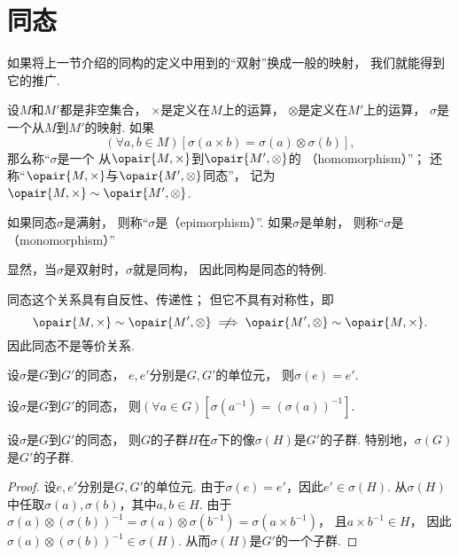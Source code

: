 \section{同态}
如果将上一节介绍的同构的定义中用到的“双射”换成一般的映射，
我们就能得到它的推广.

\begin{definition}
设\(M\)和\(M'\)都是非空集合，
\(\times\)是定义在\(M\)上的运算，
\(\otimes\)是定义在\(M'\)上的运算，
\(\sigma\)是一个从\(M\)到\(M'\)的映射.
如果\[
	(\forall a,b \in M)[
		\sigma(a \times b) = \sigma(a) \otimes \sigma(b)
	],
\]
那么称“\(\sigma\)是一个%
从\(\opair{M,\times}\)到\(\opair{M',\otimes}\)的%
（homomorphism）”；
还称“\(\opair{M,\times}\)与\(\opair{M',\otimes}\)同态”，
记为\(\opair{M,\times} \Homomorphism \opair{M',\otimes}\).
\end{definition}

如果同态\(\sigma\)是满射，
则称“\(\sigma\)是（epimorphism）”.
如果\(\sigma\)是单射，
则称“\(\sigma\)是（monomorphism）”

显然，当\(\sigma\)是双射时，\(\sigma\)就是同构，
因此同构是同态的特例.

同态这个关系具有自反性、传递性；
但它不具有对称性，即\[
	\opair{M,\times}\Homomorphism\opair{M',\otimes}
	\notimplies
	\opair{M',\otimes}\Homomorphism\opair{M,\times}.
\]
因此同态不是等价关系.

\begin{property}
设\(\sigma\)是\(G\)到\(G'\)的同态，
\(e,e'\)分别是\(G,G'\)的单位元，
则\(\sigma(e)=e'\).
\end{property}

\begin{property}
设\(\sigma\)是\(G\)到\(G'\)的同态，
则\((\forall a \in G)[\sigma(a^{-1})=(\sigma(a))^{-1}]\).
\end{property}

\begin{property}
设\(\sigma\)是\(G\)到\(G'\)的同态，
则\(G\)的子群\(H\)在\(\sigma\)下的像\(\sigma(H)\)是\(G'\)的子群.
特别地，\(\sigma(G)\)是\(G'\)的子群.
\begin{proof}
设\(e,e'\)分别是\(G,G'\)的单位元.
由于\(\sigma(e)=e'\)，因此\(e'\in\sigma(H)\).
从\(\sigma(H)\)中任取\(\sigma(a),\sigma(b)\)，其中\(a,b\in H\).
由于\(\sigma(a) \otimes (\sigma(b))^{-1}
= \sigma(a) \otimes \sigma(b^{-1})
= \sigma(a \times b^{-1})\)，
且\(a \times b^{-1} \in H\)，
因此\(\sigma(a) \otimes (\sigma(b))^{-1} \in \sigma(H)\).
从而\(\sigma(H)\)是\(G'\)的一个子群.
\end{proof}
\end{property}

